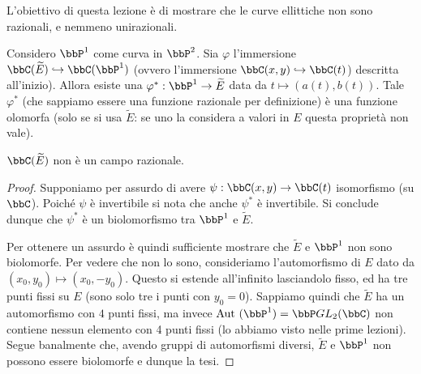 L'obiettivo di questa lezione è di mostrare che le curve ellittiche non sono razionali, e nemmeno unirazionali.

\begin{fatto}
Considero $\bbP^1$ come curva in $\bbP^2$. Sia $\varphi$ l'immersione $\bbC(\widetilde{E})\hookrightarrow\bbC(\bbP^1)$ (ovvero l'immersione $\bbC(x,y)\hookrightarrow\bbC(t)$) descritta all'inizio).
Allora esiste una $\varphi^*:\bbP^1\rightarrow\widetilde{E}$ data da $t\mapsto (a(t),b(t))$.
Tale $\varphi^*$ (che sappiamo essere una funzione razionale per definizione) è una funzione olomorfa (solo se si usa $\widetilde{E}$: se uno la considera a valori in $E$ questa proprietà non vale).
\end{fatto}

\begin{teorema}
$\bbC(\widetilde{E})$ non è un campo razionale.
\end{teorema}

\begin{proof}
Supponiamo per assurdo di avere $\psi:\bbC(x,y)\rightarrow\bbC(t)$ isomorfismo (su $\bbC$). Poiché $\psi$ è invertibile si nota che anche $\psi^*$ è invertibile. Si conclude dunque che $\psi^*$ è un biolomorfismo tra $\bbP^1$ e $\widetilde{E}$.

Per ottenere un assurdo è quindi sufficiente mostrare che $\widetilde{E}$ e $\bbP^1$ non sono biolomorfe. Per vedere che non lo sono, consideriamo l'automorfismo di $E$ dato da $(x_0,y_0)\mapsto(x_0,-y_0)$. Questo si estende all'infinito lasciandolo fisso, ed ha tre punti fissi su $E$ (sono solo tre i punti con $y_0=0$). Sappiamo quindi che $\widetilde{E}$ ha un automorfismo con $4$ punti fissi, ma invece $\Aut(\bbP^1)=\bbP GL_2(\bbC)$ non contiene nessun elemento con 4 punti fissi (lo abbiamo visto nelle prime lezioni). Segue banalmente che, avendo gruppi di automorfismi diversi, $\widetilde{E}$ e $\bbP^1$ non possono essere biolomorfe e dunque la tesi.
\end{proof}

